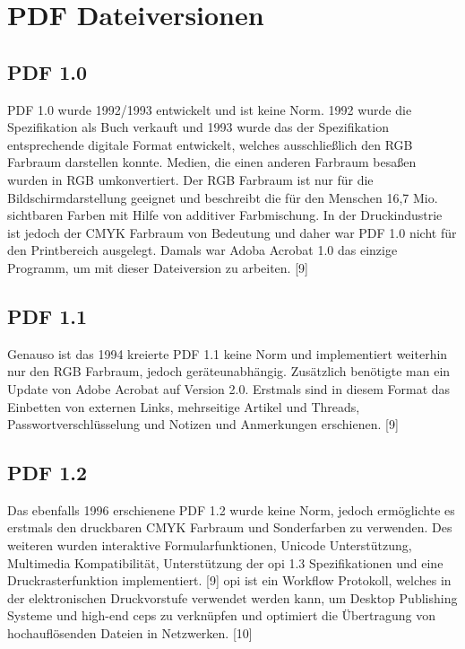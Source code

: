 \section{PDF Dateiversionen}

\subsection{PDF 1.0}
PDF 1.0 wurde 1992/1993 entwickelt und ist keine Norm. 1992 wurde die Spezifikation als Buch verkauft und 1993 wurde das der Spezifikation entsprechende digitale Format entwickelt, welches ausschließlich den RGB Farbraum darstellen konnte. Medien, die einen anderen Farbraum besaßen wurden in RGB umkonvertiert. Der RGB Farbraum ist nur für die Bildschirmdarstellung geeignet und beschreibt die für den Menschen 16,7 Mio. sichtbaren Farben mit Hilfe von additiver Farbmischung. In der Druckindustrie ist jedoch der CMYK Farbraum von Bedeutung und daher war PDF 1.0 nicht für den Printbereich ausgelegt. Damals war Adoba Acrobat 1.0 das einzige Programm, um mit dieser Dateiversion zu arbeiten. [9]

\subsection{PDF 1.1}
Genauso ist das 1994 kreierte PDF 1.1 keine Norm und implementiert weiterhin nur den RGB Farbraum, jedoch geräteunabhängig. Zusätzlich benötigte man ein Update von Adobe Acrobat auf Version 2.0. Erstmals sind in diesem Format das Einbetten von externen Links, mehrseitige Artikel und Threads, Passwortverschlüsselung und Notizen und Anmerkungen erschienen. [9]

\subsection{PDF 1.2}
Das ebenfalls 1996 erschienene PDF 1.2 wurde keine Norm, jedoch ermöglichte es erstmals den druckbaren CMYK Farbraum und Sonderfarben zu verwenden. Des weiteren wurden interaktive Formularfunktionen, Unicode Unterstützung, Multimedia Kompatibilität, Unterstützung der \gls{opi} 1.3 Spezifikationen und eine Druckrasterfunktion implementiert. [9] \gls{opi} ist ein Workflow Protokoll, welches in der elektronischen Druckvorstufe verwendet werden kann, um Desktop Publishing Systeme und high-end \gls{ceps} zu verknüpfen und optimiert die Übertragung von hochauflösenden Dateien in Netzwerken. [10]

